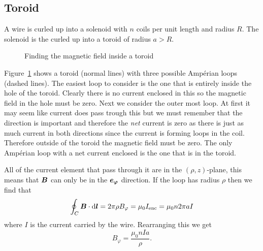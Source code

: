     \subsection{Toroid}
    A wire is curled up into a solenoid with \(n\) coils per unit length and radius \(R\).
    The solenoid is the curled up into a toroid of radius \(a > R\).
    \begin{figure}
        \centering
        \caption{Finding the magnetic field inside a toroid}
        \label{fig:toroid}
    \end{figure}
    Figure~\ref{fig:toroid} shows a toroid (normal lines) with three possible Amp\'erian loops (dashed lines).
    The easiest loop to consider is the one that is entirely inside the hole of the toroid.
    Clearly there is no current enclosed in this so the magnetic field in the hole must be zero.
    Next we consider the outer most loop.
    At first it may seem like current does pass trough this but we must remember that the direction is important and therefore the \emph{net} current is zero as there is just as much current in both directions since the current is forming loops in the coil.
    Therefore outside of the toroid the magnetic field must be zero.
    The only Amp\'erian loop with a net current enclosed is the one that is in the toroid.
    
    All of the current element that pass through it are in the \((\rho, z)\)-plane, this means that \(\bm{B}\) can only be in the \(\bm{e_{\varphi}}\) direction.
    If the loop has radius \(\rho\) then we find that
    \[\oint_C\bm{B}\cdot\dd{\bm{l}} = 2\pi\rho B_\varphi = \mu_0I_{\mathrm{enc}} = \mu_0n2\pi aI\]
    where \(I\) is the current carried by the wire.
    Rearranging this we get
    \[B_\varphi = \frac{\mu_0nIa}{\rho}.\]
    
